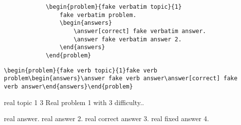 \documentclass[master]{exam}
\begin{document}
	
	
	
	\begin{verbatim}
			\begin{problem}{fake verbatim topic}{1}
				fake verbatim problem.
				\begin{answers}
					\answer[correct] fake verbatim answer.
					\answer fake verbatim answer 2.
				\end{answers}
			\end{problem}
	\end{verbatim}
	
	
	\verb!\begin{problem}{fake verb topic}{1}fake verb problem\begin{answers}\answer fake verb answer\answer[correct] fake verb answer\end{answers}\end{problem}!
	
	
	\begin{problem}{  real topic 1  }{3}
		Real problem 1  with 3 difficulty..
		\begin{answers}
			\answer real answer.
			\answer real answer 2.
			\answer[correct] real correct answer 3.
			\answer[fixed] real fixed answer 4.
		\end{answers}
	\end{problem}
	
\end{document}
